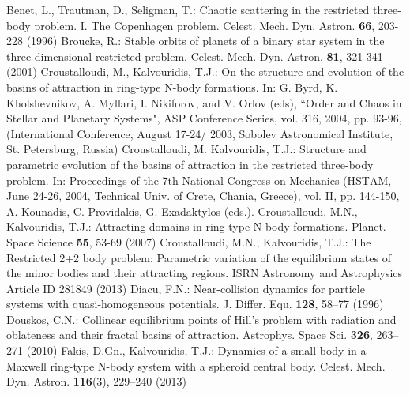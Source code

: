 \documentclass[preprint,fleqn,5p,numbers,sort&compress]{elsarticle}
\begin{document}
\begin{thebibliography}{}
Benet, L., Trautman, D., Seligman, T.: Chaotic scattering in the restricted three-body problem. I. The Copenhagen problem. Celest. Mech. Dyn. Astron. \textbf{66}, 203-228 (1996)
Broucke, R.: Stable orbits of planets of a binary star system in the three-dimensional restricted problem. Celest. Mech. Dyn. Astron. \textbf{81}, 321-341 (2001)
 Croustalloudi, M., Kalvouridis, T.J.: On the structure and evolution of the basins of attraction in ring-type N-body formations. In: G. Byrd, K. Kholshevnikov, A. Myllari, I. Nikiforov, and V. Orlov (eds), ``Order and Chaos in Stellar and Planetary Systems", ASP Conference Series, vol. 316, 2004, pp. 93-96, (International Conference, August 17-24/ 2003, Sobolev Astronomical Institute, St. Petersburg, Russia)
 Croustalloudi, M. Kalvouridis, T.J.: Structure and parametric evolution of the basins of attraction in the restricted three-body problem. In: Proceedings of the 7th National Congress on Mechanics (ΗSΤΑΜ, June 24-26, 2004, Technical Univ. of Crete, Chania, Greece), vol. II, pp. 144-150, A. Kounadis, C. Providakis, G. Exadaktylos (eds.).
 Croustalloudi, M.N., Kalvouridis, T.J.: Attracting domains in ring-type N-body formations. Planet. Space Science \textbf{55}, 53-69 (2007)
 Croustalloudi, M.N., Kalvouridis, T.J.: The Restricted 2+2 body problem: Parametric variation of the equilibrium states of the minor bodies and their attracting regions. ISRN Astronomy and Astrophysics Article ID 281849 (2013)
Diacu, F.N.: Near-collision dynamics for particle systems with quasi-homogeneous potentials. J. Differ. Equ.\textbf{ 128}, 58--77 (1996)
Douskos, C.N.: Collinear equilibrium points of Hill’s problem with radiation and oblateness and their fractal basins of attraction. Astrophys. Space Sci. \textbf{326}, 263--271 (2010)
 Fakis, D.Gn., Kalvouridis, T.J.: Dynamics of a small body in a Maxwell ring-type N-body system with a spheroid central body. Celest. Mech. Dyn. Astron. \textbf{116}(3), 229--240 (2013)

\end{thebibliography}
\end{document}
